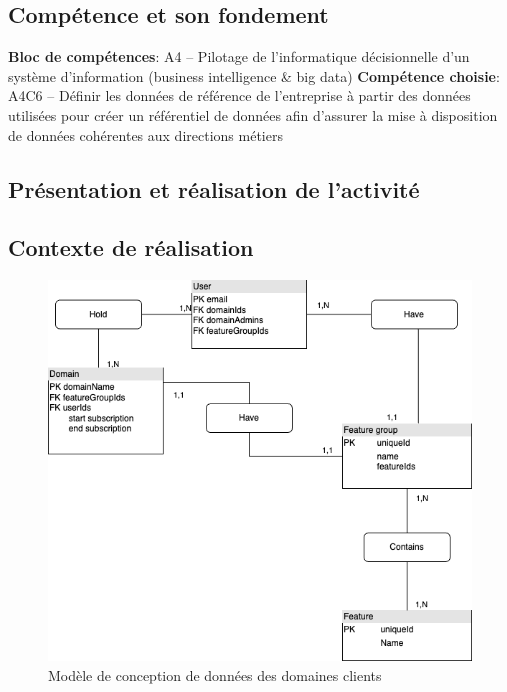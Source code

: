 \documentclass[a4paper, 11pt]{report}
\begin{document}
\subsection{Compétence et son fondement}
\textbf{Bloc de compétences}: A4 – Pilotage de l’informatique décisionnelle d’un système d’information (business intelligence & big data)
\newline
\textbf{Compétence choisie}: A4C6 – Définir les données de référence de l’entreprise à partir des données utilisées pour créer un référentiel de données afin d’assurer la mise à disposition de données cohérentes aux directions métiers
\subsection{Présentation et réalisation de l'activité}
\subsection{Contexte de réalisation}
  \begin{figure}[h]
      \centering
      \includegraphics[scale=0.40,center]{schemas/features-mcd-ralph2.png}
      \caption{Modèle de conception de données des domaines clients}
  \end{figure}
\end{document}
